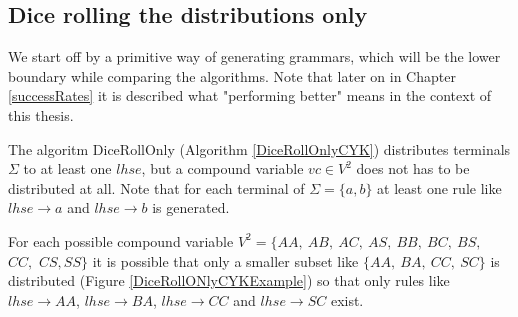 \pagebreak

\subsection{Dice rolling the distributions only} \label{diceRollOnlyCYK}
\noindent We start off by a primitive way of generating grammars, which will be the lower boundary while comparing the algorithms. Note that later on in Chapter \ref{successRates} it is described what "performing better" means in the context of this thesis. \\

\noindent
{}

\noindent The algoritm DiceRollOnly (Algorithm \ref{DiceRollOnlyCYK}) distributes terminals $\Sigma$ to at least one $lhse$, but a compound variable $vc \in V^2$ does not has to be distributed at all. Note that for each terminal of $\Sigma=\{a,b\}$ at least one rule like $lhse\rightarrow a$ and $lhse\rightarrow b$ is generated.\\

\begin{testexample}
	For each possible compound variable $V^2=\{AA,~AB,~AC,~AS,~BB,~BC,~BS,~$ $CC,$ $CS,SS\}$ it is possible that only a smaller subset like $\{AA,~BA,~CC,~SC\}$ is distributed (Figure \ref{DiceRollONlyCYKExample}) so that only rules like $lhse\rightarrow AA$, $lhse\rightarrow BA$, $lhse\rightarrow CC$ and $lhse\rightarrow SC$ exist.\\
	
	\begin{minipage}{6in}
		\centering
	\end{minipage}
	\label{DiceRollONlyCYKExample}
\end{testexample}



